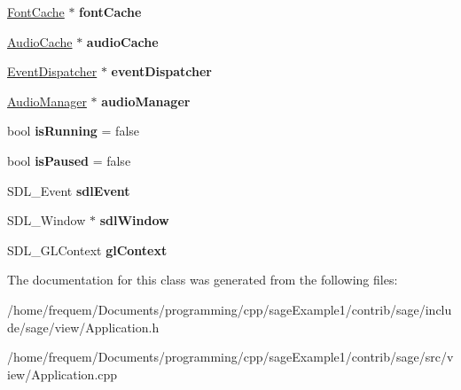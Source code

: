 \begin{DoxyCompactItemize}
\mbox{\hyperlink{classsage_1_1FontCache}{Font\+Cache}} $\ast$ {\bfseries font\+Cache}
\item 
\mbox{\label{classsage_1_1Application_a38828d2324d2b6a9feae40049eee2aa7}} 
\mbox{\hyperlink{classsage_1_1AudioCache}{Audio\+Cache}} $\ast$ {\bfseries audio\+Cache}
\item 
\mbox{\label{classsage_1_1Application_af44decd857e2843750a781ec141163f0}} 
\mbox{\hyperlink{classsage_1_1EventDispatcher}{Event\+Dispatcher}} $\ast$ {\bfseries event\+Dispatcher}
\item 
\mbox{\label{classsage_1_1Application_aa5d509f796f7d2d9a779fc01143c3a75}} 
\mbox{\hyperlink{classsage_1_1AudioManager}{Audio\+Manager}} $\ast$ {\bfseries audio\+Manager}
\item 
\mbox{\label{classsage_1_1Application_aa5197cd07379bdbc371c26c21f936c17}} 
bool {\bfseries is\+Running} = false
\item 
\mbox{\label{classsage_1_1Application_a2c8135f73ec3091ffcb750dcc280c4d2}} 
bool {\bfseries is\+Paused} = false
\item 
\mbox{\label{classsage_1_1Application_a5db88bba11534e6b93b7f07d2c5c19f8}} 
S\+D\+L\+\_\+\+Event {\bfseries sdl\+Event}
\item 
\mbox{\label{classsage_1_1Application_ab8d3166ecc1b2c3387da0633557f0d77}} 
S\+D\+L\+\_\+\+Window $\ast$ {\bfseries sdl\+Window}
\item 
\mbox{\label{classsage_1_1Application_af4b3656acba3ea7f6409885223e49dc2}} 
S\+D\+L\+\_\+\+G\+L\+Context {\bfseries gl\+Context}
\end{DoxyCompactItemize}


The documentation for this class was generated from the following files\+:\begin{DoxyCompactItemize}
\item 
/home/frequem/\+Documents/programming/cpp/sage\+Example1/contrib/sage/include/sage/view/Application.\+h\item 
/home/frequem/\+Documents/programming/cpp/sage\+Example1/contrib/sage/src/view/Application.\+cpp\end{DoxyCompactItemize}
